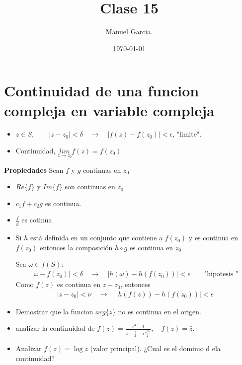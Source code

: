 \documentclass{article}
\title{Clase 15 }
\author{Manuel Garcia.}
\date{\today}
\newcommand{\caja}[3]{%
  \begin{tcolorbox}[colback=#1!5!white,colframe=#1!25!black,title=#2]
    #3
  \end{tcolorbox}%
}
\begin{document}
\maketitle

\section{Continuidad de una funcion compleja en variable compleja }
\begin{itemize}
  \item $ z \in S , \qquad \left|z - z_0 \right|<\delta \quad \rightarrow \quad \left|f(z) - f(z_0 )\right|< \epsilon  $, "limite". 
  \item Continuidad, $ \underset{z \rightarrow z_0 }{lim }f(z) = f(z_0)  $
\end{itemize}
\textbf{Propiedades } Sean $ f  $ y $ g   $ continuas en $ z_0  $
\begin{itemize}
  \item $ Re\{f \} $ y $ Im\{f \} $ son continuas en $ z_0  $
  \item $ c_1 f + c_2 g  $ es continua. 
  \item $ \frac{f}{g } $ es cotinua 
  \item Si $ h  $ está definida en un conjunto que contiene a $ f(z_0 ) $ y es continua en $ f(z_0 ) $ entonces la composición $ h \circ  g $ es continua en $ z_0  $

    Sea $ \omega \in f(S)  $: 
    \begin{gather*}
      \left|\omega - f (z_0 )\right|< \delta \quad \rightarrow \quad \left|h(\omega) - h (f(z_0 ))\right|<\epsilon \qquad \text{"hipotesis "} 
    \end{gather*}
    Como $ f(z)  $ es continua en $ z - z_0  $, entonces 
    \begin{gather*}
      \left|z-z_0 \right|< \nu \quad \rightarrow \quad \left|h(f(z)) - h(f(z_0 ))\right|<\epsilon  
    \end{gather*}
\end{itemize}

\caja{red}{Ejercicio }{
  \begin{itemize}
    \item Demostrar que la funcion $ arg\{z \} $ no es continua en el origen. 
    \item analizar la continuidad de $ f(z)  = \frac{z ^3 - 1 }{z + \frac{1}{2} - i \frac{\sqrt{3 } }{2}}, \quad f(z) = \hat z  $.
    \item Analizar $ f(z) = \log{z } $ (valor principal). ¿Cual es el dominio d ela continuidad?
  \end{itemize}
}
\end{document}
